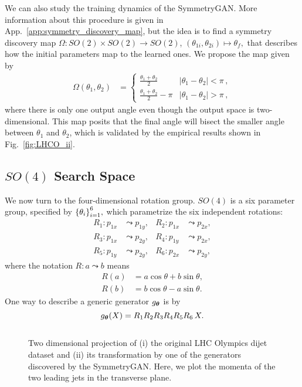 \documentclass[aps,prx,reprint,preprintnumbers,superscriptaddress,nofootinbib,longbibliography,floatfix]{revtex4-1}
\DeclareRobustCommand{\App}[1]{App.~\ref{app:#1}}
\DeclareRobustCommand{\Fig}[1]{Fig.~\ref{fig:#1}}
\begin{document}
We can also study the training dynamics of the SymmetryGAN.
%
More information about this procedure is given in \App{symmetry_discovery_map}, but the idea is to find a symmetry discovery map $\Omega: SO(2)\times SO(2) \to SO(2)$, $(\theta_{1i}, \theta_{2i})\mapsto\theta_{f},$ that describes how the initial parameters map to the learned ones.
%
We propose the map given by
\begin{equation}
\begin{split}
    \Omega(\theta_1, \theta_2) &= \begin{cases}\frac{\theta_1 + \theta_2}{2}& |\theta_1 - \theta_2| < \pi\,,\\
    \frac{\theta_1 + \theta_2}{2} - \pi & |\theta_1 - \theta_2| > \pi\,,
    \end{cases}
    \end{split}
\end{equation}
%
where there is only one output angle even though the output space is two-dimensional.
%
This map posits that the final angle will bisect the smaller angle between $\theta_1$ and $\theta_2$, which is validated by the empirical results shown in \Fig{LHCO_ii}.


\subsection{$SO(4)$ Search Space}

We now turn to the four-dimensional rotation group.
%
$SO(4)$ is a six parameter group, specified by $\qty{\theta_i}_{i=1}^6,$ which parametrize the six independent rotations:
%
\begin{align}
R_1\colon p_{1x}&\leadsto p_{1y},&
R_2\colon p_{1x}&\leadsto p_{2x},\\
R_3\colon p_{1x}&\leadsto p_{2y},&
R_4\colon p_{1y}&\leadsto p_{2x},\\
R_5\colon p_{1y}&\leadsto p_{2y},&
R_6\colon p_{2x}&\leadsto p_{2y},
\end{align}
where the notation $R: a \leadsto b$ means
%
\begin{align}
    R(a) &= a\cos\theta + b\sin\theta,\\
    R(b) &= b\cos\theta - a\sin\theta.
\end{align}
%
One way to describe a generic generator $g_{\vb*\theta}$ is
%
by
\begin{equation}
    g_{\vb*\theta}(X) = R_1 R_2 R_3 R_4 R_5 R_6 \, X.
\end{equation}

\begin{figure*}[p]
    \centering
    $\quad$
    \caption{
    Two dimensional projection of (i) the original LHC Olympics dijet dataset and (ii) its transformation by one of the generators discovered by the SymmetryGAN.
    Here, we plot the momenta of the two leading jets in the transverse plane.}
    \label{fig:LHCO_Comparison}
\end{figure*}
\end{document}
